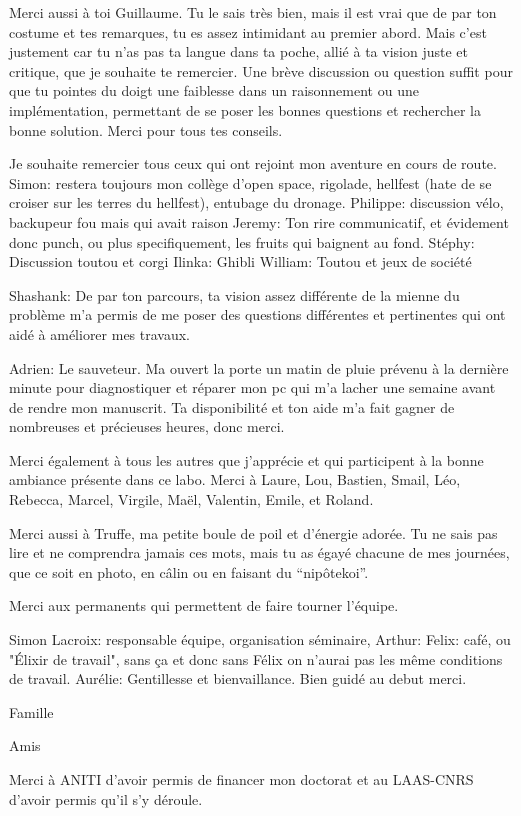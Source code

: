 Merci aussi à toi Guillaume. 
Tu le sais très bien, mais il est vrai que de par ton costume et tes remarques, tu es assez intimidant au premier abord. 
Mais c'est justement car tu n'as pas ta langue dans ta poche, allié à ta vision juste et critique, que je souhaite te remercier. Une brève discussion ou question suffit pour que tu pointes du doigt une faiblesse dans un raisonnement ou une implémentation, permettant de se poser les bonnes questions et rechercher la bonne solution. Merci pour tous tes conseils.



Je souhaite remercier tous ceux qui ont rejoint mon aventure en cours de route.   
Simon: restera toujours mon collège d'open space, rigolade, hellfest (hate de se croiser sur les terres du hellfest), entubage du dronage.  
Philippe: discussion vélo, backupeur fou mais qui avait raison
Jeremy: Ton rire communicatif, et évidement donc punch, ou plus specifiquement, les fruits qui baignent au fond. 
Stéphy: Discussion toutou et corgi 
Ilinka: Ghibli
William: Toutou et jeux de société 

Shashank: De par ton parcours, ta vision assez différente de la mienne du problème m'a permis de me poser des questions différentes et pertinentes qui ont aidé à améliorer mes travaux.  

Adrien: Le sauveteur. Ma ouvert la porte un matin de pluie prévenu à la dernière minute pour diagnostiquer et réparer mon pc qui m'a lacher une semaine avant de rendre mon manuscrit. Ta disponibilité et ton aide m'a fait gagner de nombreuses et précieuses heures, donc merci.  

Merci également à tous les autres que j'apprécie et qui participent à la bonne ambiance présente dans ce labo. Merci à
Laure, Lou, Bastien, Smail, Léo, Rebecca, Marcel, Virgile, Maël, Valentin, Emile, et Roland.



Merci aussi à Truffe, ma petite boule de poil et d'énergie adorée. Tu ne sais pas lire et ne comprendra jamais ces mots, mais tu as égayé chacune de mes journées, que ce soit en photo, en câlin ou en faisant du ``nipôtekoi''.



Merci aux permanents qui permettent de faire tourner l'équipe.   

Simon Lacroix: responsable équipe, organisation séminaire, 
Arthur: 
Felix: café, ou "Élixir de travail", sans ça et donc sans Félix on n'aurai pas les même conditions de travail. 
Aurélie: Gentillesse et bienvaillance. Bien guidé au debut merci. 



Famille



Amis


Merci à ANITI d'avoir permis de financer mon doctorat et au LAAS-CNRS d'avoir permis qu'il s'y déroule.
